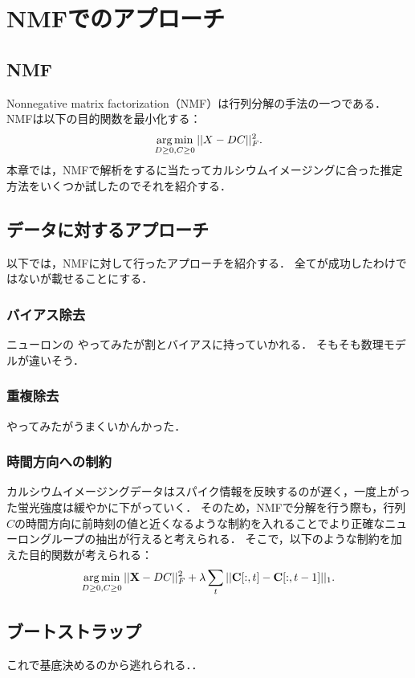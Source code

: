 \section{NMFでのアプローチ}
\subsection{NMF}
Nonnegative matrix factorization（NMF）は行列分解の手法の一つである．
NMFは以下の目的関数を最小化する：
\begin{equation}
	\operatorname*{arg\,min}_{D \geq 0, C \geq 0} ||X - DC||_F^2.
  \label{eq:NMF}
\end{equation}
本章では，NMFで解析をするに当たってカルシウムイメージングに合った推定方法をいくつか試したのでそれを紹介する．

\subsection{データに対するアプローチ}
以下では，NMFに対して行ったアプローチを紹介する．
全てが成功したわけではないが載せることにする．
\subsubsection{バイアス除去}
ニューロンの
やってみたが割とバイアスに持っていかれる．
そもそも数理モデルが違いそう．

\subsubsection{重複除去}
やってみたがうまくいかんかった．

\subsubsection{時間方向への制約}
カルシウムイメージングデータはスパイク情報を反映するのが遅く，一度上がった蛍光強度は緩やかに下がっていく．
そのため，NMFで分解を行う際も，行列$C$の時間方向に前時刻の値と近くなるような制約を入れることでより正確なニューロングループの抽出が行えると考えられる．
そこで，以下のような制約を加えた目的関数が考えられる：
\begin{equation}
	\operatorname*{arg\,min}_{D \geq 0, C \geq 0}||{\mathbf X - DC}||^2_F + \lambda \sum_t||{\mathbf C}[:,t] - {\mathbf C}[:,t-1]||_1.
  \label{eq:NMF-ar}
\end{equation}

\subsection{ブートストラップ}
これで基底決めるのから逃れられる．．
